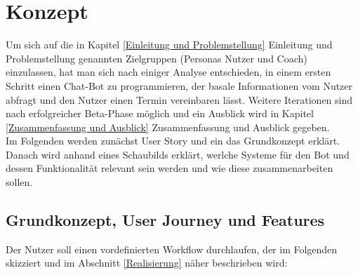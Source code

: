 \chapter{Konzept} \label{Konzept}


Um sich auf die in Kapitel \ref{Einleitung und Problemstellung} Einleitung und Problemstellung genannten Zielgruppen (Personas Nutzer und Coach) einzulassen, hat man sich nach einiger Analyse entschieden, in einem ersten Schritt einen Chat-Bot zu programmieren, der basale Informationen vom Nutzer abfragt und den Nutzer einen Termin vereinbaren lässt. Weitere Iterationen sind nach erfolgreicher Beta-Phase möglich und ein Ausblick wird in Kapitel \ref{Zusammenfassung und Ausblick} Zusammenfassung und Ausblick gegeben. \\ Im Folgenden werden zunächst User Story und ein das Grundkonzept erklärt. Danach wird anhand eines Schaubilds erklärt, werlche Systeme für den Bot und dessen Funktionalität relevant sein werden und wie diese zusammenarbeiten sollen. 

\section{Grundkonzept, User Journey und Features} \label{Konzept: User Journey}
	Der Nutzer soll einen vordefinierten Workflow durchlaufen, der im Folgenden skizziert und im Abschnitt \ref*{Realisierung} näher beschrieben wird:


